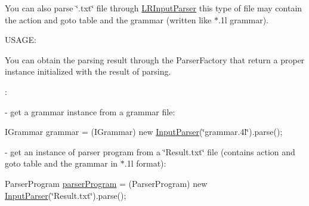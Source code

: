 You can also parse \char`\"{}.\-txt\char`\"{} file through \hyperlink{classinput_parser_1_1_l_r_input_parser}{L\-R\-Input\-Parser} this type of file may contain the action and goto table and the grammar (written like $\ast$.1l grammar).\par


U\-S\-A\-G\-E\-:\par
 You can obtain the parsing result through the Parser\-Factory that return a proper instance initialized with the result of parsing.\par
 \-: \par
-\/ get a grammar instance from a grammar file\-: \par
 I\-Grammar grammar = (I\-Grammar) new \hyperlink{classinput_parser_1_1_input_parser}{Input\-Parser}(\char`\"{}grammar.\-4l\char`\"{}).parse(); \par
 \par
-\/ get an instance of parser program from a \char`\"{}\-Result.\-txt\char`\"{} file (contains action and goto table and the grammar in $\ast$.1l format)\-: \par
 Parser\-Program \hyperlink{namespaceparser_program}{parser\-Program} = (Parser\-Program) new \hyperlink{classinput_parser_1_1_input_parser}{Input\-Parser}(\char`\"{}\-Result.\-txt\char`\"{}).parse(); 